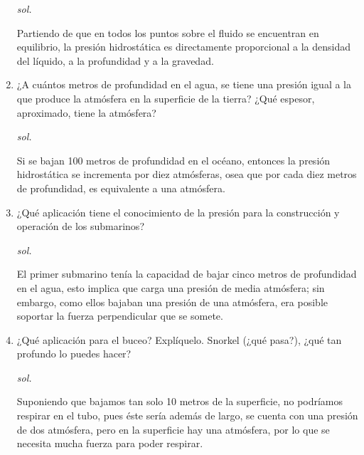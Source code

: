 \begin{enumerate}
    \textit{sol. }
    
Partiendo de que en todos los puntos sobre el fluido se encuentran en equilibrio, la presión hidrostática es directamente proporcional a la densidad del líquido, a la profundidad y a la gravedad.
    \item  ¿A cuántos metros de profundidad en el agua, se tiene una presión igual a la que produce la atmósfera en la superficie de la tierra? ¿Qué espesor, aproximado, tiene la atmósfera?
    
    \textit{sol. }
        
    Si se bajan 100 metros de profundidad en el océano, entonces la presión hidrostática se incrementa por diez atmósferas, osea que por cada diez metros de profundidad, es equivalente a una atmósfera. 
    
    \item  ¿Qué aplicación tiene el conocimiento de la presión para la construcción y operación de los submarinos?
    
    \textit{sol. }
    
    El primer submarino tenía la capacidad de bajar cinco metros de profundidad en el agua, esto implica que carga una presión de media atmósfera; sin embargo, como ellos bajaban una presión de una atmósfera, era posible soportar la fuerza perpendicular que se somete.
    

    \item  ¿Qué aplicación para el buceo? Explíquelo. Snorkel (¿qué pasa?), ¿qué tan profundo lo puedes hacer?
    
    \textit{sol. }
    
    
    Suponiendo que bajamos tan solo 10 metros de la superficie, no podríamos respirar en el tubo, pues éste sería además de largo, se cuenta con una presión de dos atmósfera, pero en la superficie hay una atmósfera, por lo que se necesita mucha fuerza para poder respirar.
    

\end{enumerate}
